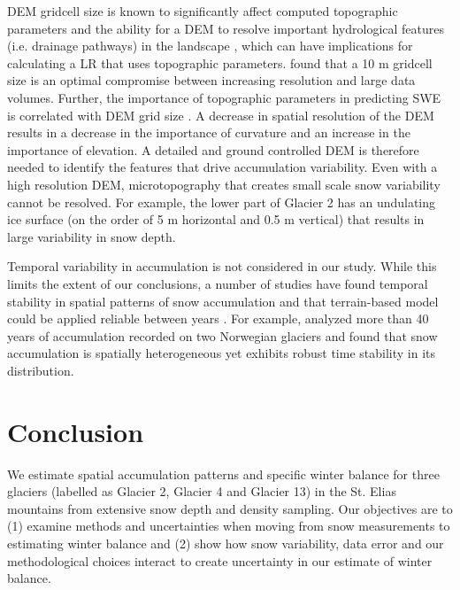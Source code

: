 \documentclass[twocolumn, letterpaper]{igs}
\begin{document}
DEM gridcell size is known to significantly affect computed topographic parameters and the ability for a DEM to resolve important hydrological features (i.e. drainage pathways) in the landscape \citep{Zhang1994, Garbrecht1994, Guo-an2001, Lopez2010}, which can have implications for calculating a LR that uses topographic parameters.  \cite{Zhang1994} found that a 10 m gridcell size is an optimal compromise between increasing resolution and large data volumes. Further, the importance of topographic parameters in predicting SWE is correlated with DEM grid size \citep[e.g.][]{Kienzle2004, Lopez2010}. A decrease in spatial resolution of the DEM results in a decrease in the importance of curvature and an increase in the importance of elevation. A detailed and ground controlled DEM is therefore needed to identify the features that drive accumulation variability. Even with a high resolution DEM, microtopography that creates small scale snow variability cannot be resolved. For example, the lower part of Glacier 2 has an undulating ice surface (on the order of 5 m horizontal and 0.5 m vertical) that results in large variability in snow depth.

Temporal variability in accumulation is not considered in our study. While this limits the extent of our conclusions, a number of studies have found temporal stability in spatial patterns of snow accumulation and that terrain-based model could be applied reliable between years \citep[e.g.][]{Grunewald2013}. For example, \cite{Walmsley2015} analyzed more than 40 years of accumulation recorded on two Norwegian glaciers and found that snow accumulation is spatially heterogeneous yet exhibits robust time stability in its distribution. 

\section{Conclusion}

We estimate spatial accumulation patterns and specific winter balance for three glaciers (labelled as Glacier 2, Glacier 4 and Glacier 13) in the St. Elias mountains from extensive snow depth and density sampling. Our objectives are to (1) examine methods and uncertainties when moving from snow measurements to estimating winter balance and (2) show how snow variability, data error and our methodological choices interact to create uncertainty in our estimate of winter balance.
\end{document}
